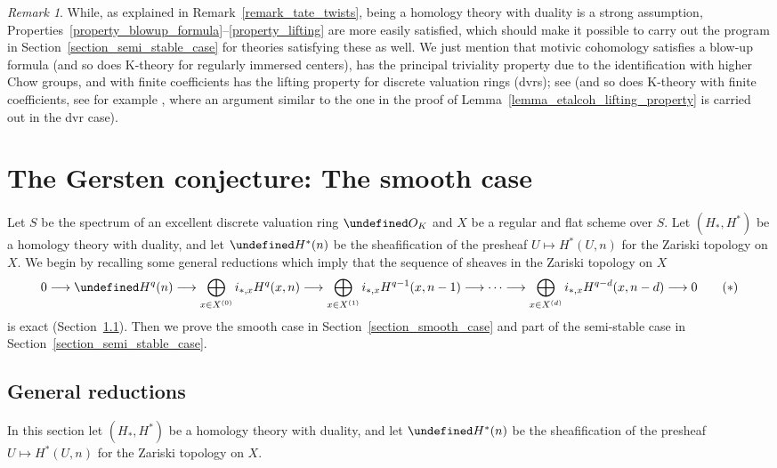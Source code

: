\documentclass[10pt,a4paper]{article}
\let\cal\undefined
\numberwithin{equation}{section}
\newtheorem{Key lemma}[theorem]{Key lemma}
\theoremstyle{definition}
\theoremstyle{remark}
\newtheorem{remark}[theorem]{Remark}
\newcommand{\To}{\longrightarrow}
\newcommand{\cal}{\mathcal}
\begin{document}
\begin{remark}
While, as explained in Remark~\ref{remark_tate_twists}, being a homology theory with duality is a strong assumption, Properties~\ref{property_blowup_formula}--\ref{property_lifting} are more easily satisfied, which should make it possible to carry out the program in Section~\ref{section_semi_stable_case} for theories satisfying these as well. We just mention that motivic cohomology satisfies a blow-up formula (and so does K-theory for regularly immersed centers), has the principal triviality property due to the identification with higher Chow groups, and with finite coefficients has the lifting property for discrete valuation rings (dvrs); see \cite[Proof of Corollary~4.5]{Ge04} (and so does K-theory with finite coefficients, see for example \cite[Theorem V.6.9.1]{We13}, where an argument similar to the one in the proof of Lemma~\ref{lemma_etalcoh_lifting_property} is carried out in the dvr case).
\end{remark}

\section{The Gersten conjecture: The smooth case}
Let $S$ be the spectrum of an excellent discrete valuation ring $\cal O_K$ and $X$ be a regular and flat scheme over $S$. Let $(H_*,H^*)$ be a homology theory with duality, and let $\cal H^*(n)$ be the sheafification of the presheaf $U\mapsto H^*(U,n)$ for the Zariski topology on $X$. We begin by recalling some general reductions which imply that the sequence of sheaves in the Zariski topology on $X$
\begin{equation}\label{star}
0\To \cal H^q(n) \To \bigoplus_{x\in X^{(0)}}i_{*,x}H^{q}(x,n)\To \bigoplus_{x\in X^{(1)}}i_{*,x}H^{q-1}(x,n-1)\To\cdots\To \bigoplus_{x\in X^{(d)}}i_{*,x}H^{q-d}(x,n-d)\To 0 \tag{$*$}
\end{equation}
is exact (Section~\ref{section_general_reductions}). Then we prove the smooth case in Section~\ref{section_smooth_case} and  part of the semi-stable case in Section~\ref{section_semi_stable_case}.


\subsection{General reductions}\label{section_general_reductions}
In this section let $(H_*,H^*)$ be a homology theory with duality, and let $\cal H^*(n)$ be the sheafification of the presheaf $U\mapsto H^*(U,n)$ for the Zariski topology on $X$.
\end{document}

